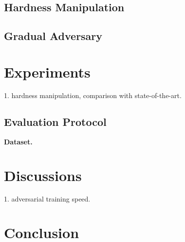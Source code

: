 \documentclass[10pt,twocolumn,letterpaper]{article}
\begin{document}
\subsection{Hardness Manipulation}

\subsection{Gradual Adversary}

\section{Experiments}
\label{sec:4}

1. hardness manipulation, comparison with state-of-the-art.

\subsection{Evaluation Protocol}

\textbf{Dataset.}

\section{Discussions}
\label{sec:5}

1. adversarial training speed.

\section{Conclusion}
\label{sec:6}

\cite{Authors14}

{\small


}


\end{document}
